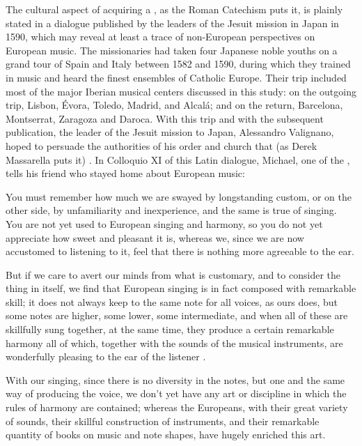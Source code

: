 The cultural aspect of acquiring a , as the Roman
Catechism puts it, is plainly stated in a dialogue published by the leaders of
the Jesuit mission in Japan in 1590, which may reveal at least a trace of
non-European perspectives on European music.%
    \Autocite{Sande:DeMissioneLegatorum}
The missionaries had taken four Japanese noble youths on a grand tour of Spain
and Italy between 1582 and 1590, during which they trained in music and heard
the finest ensembles of Catholic Europe.
Their trip included most of the major Iberian musical centers discussed in this
study: on the outgoing trip, Lisbon, Évora, Toledo, Madrid, and Alcalá; and on
the return, Barcelona, Montserrat, Zaragoza and Daroca.
With this trip and with the subsequent publication, the leader of the Jesuit
mission to Japan, Alessandro Valignano, hoped to persuade the authorities of his
order and church that (as Derek Massarella puts it) .%
    \Autocite[4]{Massarella:JapaneseTravellers}
In Colloquio XI of this Latin dialogue, Michael, one of the
, tells his friend who stayed home about European music:
\begin{quoting}
    You must remember \Dots{} how much we are swayed by longstanding custom, or
    on the other side, by unfamiliarity and inexperience, and the same is true
    of singing.
    You are not yet used to European singing and harmony, so you do not yet
    appreciate how sweet and pleasant it is, whereas we, since we are now
    accustomed to listening to it, feel that there is nothing more agreeable to
    the ear.

    But if we care to avert our minds from what is customary, and to consider
    the thing in itself, we find that European singing is in fact composed with
    remarkable skill; it does not always keep to the same note for all voices,
    as ours does, but some notes are higher, some lower, some intermediate, and
    when all of these are skillfully sung together, at the same time, they
    produce a certain remarkable harmony \Dots{} all of which, \Dots{} together
    with the sounds of the musical instruments, are wonderfully pleasing to the
    ear of the listener \Dots{}.

    With our singing, since there is no diversity in the notes, but one and the
    same way of producing the voice, we don't yet have any art or discipline in
    which the rules of harmony are contained; whereas the Europeans, with their
    great variety of sounds, their skillful construction of instruments, and
    their remarkable quantity of books on music and note shapes, have hugely
    enriched this art.%
        \Autocite[155-156]{Massarella:JapaneseTravellers}
\end{quoting}
